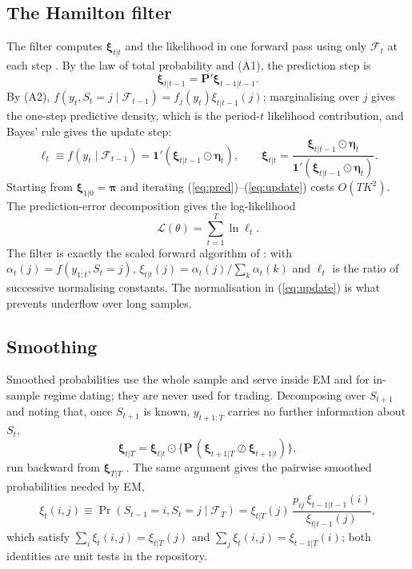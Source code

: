 \documentclass[11pt,a4paper]{article}
\newcommand{\F}{\mathcal{F}}
\newcommand{\bxi}{\bm{\xi}}
\newcommand{\bP}{\mathbf{P}}
\newcommand{\beeta}{\bm{\eta}}
\newcommand{\LL}{\mathcal{L}}
\begin{document}
\subsection{The Hamilton filter}
The filter computes $\bxi_{t|t}$ and the likelihood in one forward pass using only $\F_t$ at each step \citep[ch.~22]{hamilton1994}. By the law of total probability and (A1), the prediction step is
\begin{equation}\label{eq:pred}
\bxi_{t|t-1}=\bP'\bxi_{t-1|t-1}.
\end{equation}
By (A2), $f(y_t,S_t=j\mid\F_{t-1})=f_j(y_t)\xi_{t|t-1}(j)$; marginalising over $j$ gives the one-step predictive density, which is the period-$t$ likelihood contribution, and Bayes' rule gives the update step:
\begin{equation}\label{eq:update}
\ell_t\equiv f(y_t\mid\F_{t-1})=\mathbf 1'(\bxi_{t|t-1}\odot\beeta_t),\qquad
\bxi_{t|t}=\frac{\bxi_{t|t-1}\odot\beeta_t}{\mathbf 1'(\bxi_{t|t-1}\odot\beeta_t)}.
\end{equation}
Starting from $\bxi_{1|0}=\bm\pi$ and iterating (\ref{eq:pred})--(\ref{eq:update}) costs $O(TK^2)$. The prediction-error decomposition gives the log-likelihood
\begin{equation}\label{eq:lik}
\LL(\theta)=\sum_{t=1}^T\ln\ell_t .
\end{equation}
The filter is exactly the scaled forward algorithm of \citet{rabiner1989}: with $\alpha_t(j)=f(y_{1:t},S_t=j)$, $\xi_{t|t}(j)=\alpha_t(j)/\sum_k\alpha_t(k)$ and $\ell_t$ is the ratio of successive normalising constants. The normalisation in (\ref{eq:update}) is what prevents underflow over long samples.

\subsection{Smoothing}
Smoothed probabilities use the whole sample and serve inside EM and for in-sample regime dating; they are never used for trading. Decomposing over $S_{t+1}$ and noting that, once $S_{t+1}$ is known, $y_{t+1:T}$ carries no further information about $S_t$,
\begin{equation}\label{eq:smooth}
\bxi_{t|T}=\bxi_{t|t}\odot\bigl\{\bP\,(\bxi_{t+1|T}\oslash\bxi_{t+1|t})\bigr\},
\end{equation}
run backward from $\bxi_{T|T}$ \citep{kim1994,kimnelson1999}. The same argument gives the pairwise smoothed probabilities needed by EM,
\begin{equation}\label{eq:pair}
\xi_t(i,j)\equiv\Pr(S_{t-1}=i,S_t=j\mid\F_T)=\xi_{t|T}(j)\,\frac{p_{ij}\,\xi_{t-1|t-1}(i)}{\xi_{t|t-1}(j)},
\end{equation}
which satisfy $\sum_i\xi_t(i,j)=\xi_{t|T}(j)$ and $\sum_j\xi_t(i,j)=\xi_{t-1|T}(i)$; both identities are unit tests in the repository.
\end{document}

